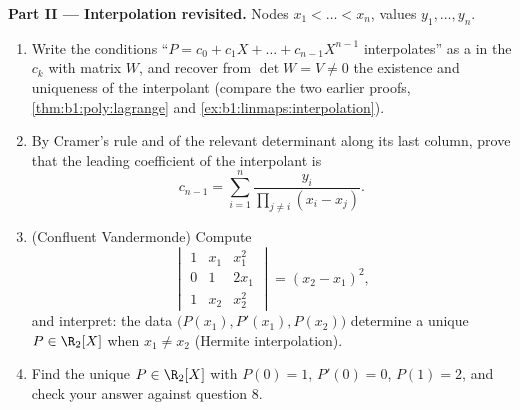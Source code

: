 \begin{problem}
\medskip
\noindent\textbf{Part II --- Interpolation revisited.} Nodes
$x_1 < \dots < x_n$, values $y_1, \dots, y_n$.
\begin{enumerate}[resume]
  \item Write the conditions ``$P = c_0 + c_1X + \dots +
        c_{n-1}X^{n-1}$ interpolates'' as a  in the
        $c_k$ with matrix $W$, and recover from $\det W = V \neq
        0$ the existence and uniqueness of the interpolant
        (compare the two earlier proofs,
        \cref{thm:b1:poly:lagrange} and
        \cref{ex:b1:linmaps:interpolation}).
  \item By Cramer's rule and  of the relevant
        determinant along its last column, prove that the
        leading coefficient of the interpolant is
        \[
        c_{n-1} = \sum_{i=1}^{n}
        \frac{y_i}{\prod_{j \neq i}(x_i - x_j)} .
        \]
  \item (Confluent Vandermonde) Compute
        \[
        \begin{vmatrix}
        1 & x_1 & x_1^2\\
        0 & 1 & 2x_1\\
        1 & x_2 & x_2^2
        \end{vmatrix}
        = (x_2 - x_1)^2 ,
        \]
        and interpret: the data $\bigl(P(x_1), P'(x_1),
        P(x_2)\bigr)$ determine a unique $P \in \R_2[X]$ when
        $x_1 \neq x_2$ (Hermite interpolation).
  \item Find the unique $P \in \R_2[X]$ with $P(0) = 1$, $P'(0)
        = 0$, $P(1) = 2$, and check your answer against
        question 8.
\end{enumerate}


\end{problem}
